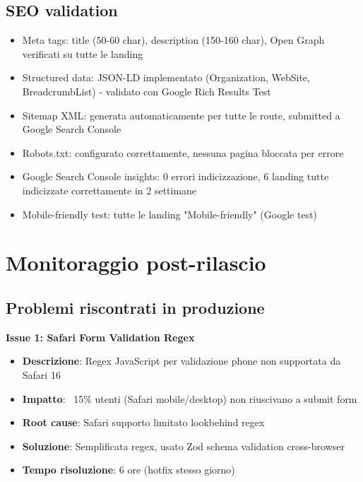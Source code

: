 \subsection{SEO validation}
\begin{itemize}
  \item Meta tags: title (50-60 char), description (150-160 char), 
        Open Graph verificati su tutte le landing
  \item Structured data: JSON-LD implementato (Organization, WebSite, 
        BreadcrumbList) - validato con Google Rich Results Test
  \item Sitemap XML: generata automaticamente per tutte le route, 
        submitted a Google Search Console
  \item Robots.txt: configurato correttamente, nessuna pagina bloccata 
        per errore
  \item Google Search Console insights: 0 errori indicizzazione, 
        6 landing tutte indicizzate correttamente in 2 settimane
  \item Mobile-friendly test: tutte le landing "Mobile-friendly" 
        (Google test)
\end{itemize}

\section{Monitoraggio post-rilascio}
\subsection{Problemi riscontrati in produzione}
\textbf{Issue 1: Safari Form Validation Regex}
\begin{itemize}
  \item \textbf{Descrizione}: Regex JavaScript per validazione phone 
        non supportata da Safari 16
  \item \textbf{Impatto}: ~15\% utenti (Safari mobile/desktop) non 
        riuscivano a submit form
  \item \textbf{Root cause}: Safari supporto limitato lookbehind regex
  \item \textbf{Soluzione}: Semplificata regex, usato Zod schema 
        validation cross-browser
  \item \textbf{Tempo risoluzione}: 6 ore (hotfix stesso giorno)
\end{itemize}

